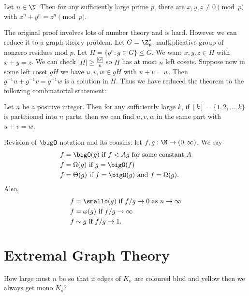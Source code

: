 \documentclass[a4paper]{article}
\newcommand*{\Omg}{\Omega}
\newcommand*{\bigT}{\Theta}
\newcommand*{\smallomg}{\omega}
\begin{document}
\begin{enumerate}
  \begin{theorem}
    Let \(n \in \N\). Then for any sufficiently large prime \(p\), there are \(x, y, z \neq 0 \pmod p\) with \(x^n + y^n = z^n \pmod p\).
  \end{theorem}

  The original proof involves lots of number theory and is hard. However we can reduce it to a graph theory problem. Let \(G = \Z_p^*\), multiplicative group of nonzero residues mod \(p\). Let \(H = \{g^n: g \in G\} \leq G\). We want \(x, y, z \in H\) with \(x + y = z\). We can check \(|H| \geq \frac{|G|}{n}\) so \(H\) has at most \(n\) left cosets. Suppose now in some left coset \(gH\) we have \(u, v, w \in gH\) with \(u + v = w\). Then \(g^{-1}u + g^{-1}v = g^{-1}w\) is a solution in \(H\). Thus we have reduced the theorem to the following combinatorial statement:

  \begin{theorem}[Schur]
    Let \(n\) be a positive integer. Then for any sufficiently large \(k\), if \([k] = \{1, 2, \dots, k\}\) is partitioned into \(n\) parts, then we can find \(u, v, w\) in the same part with \(u + v = w\).
  \end{theorem}
\end{enumerate}


Revision of \(\bigO\) notation and its cousins: let \(f,g:\N\to (0,\infty)\). We say
\begin{align*}
  f &= \bigO(g) \text{ if } f< Ag \text{ for some constant } A \\
  f &= \Omg(g) \text{ if } g=\bigO(f) \\
  f &= \bigT(g) \text{ if } f=\bigO(g) \text{ and } f = \Omg(g).
\end{align*}
Also,
\begin{align*}
  f &= \smallo(g) \text{ if } f/g\to 0 \text{ as } n\to \infty \\
  f &= \smallomg(g) \text{ if } f/g\to \infty \\
  f &\sim g \text{ if } f/g\to 1.
\end{align*}

\section{Extremal Graph Theory}

\begin{question}
  How large must \(n\) be so that if edges of \(K_n\) are coloured blud and yellow then we always get mono \(K_s\)?
\end{question}
\end{document}
